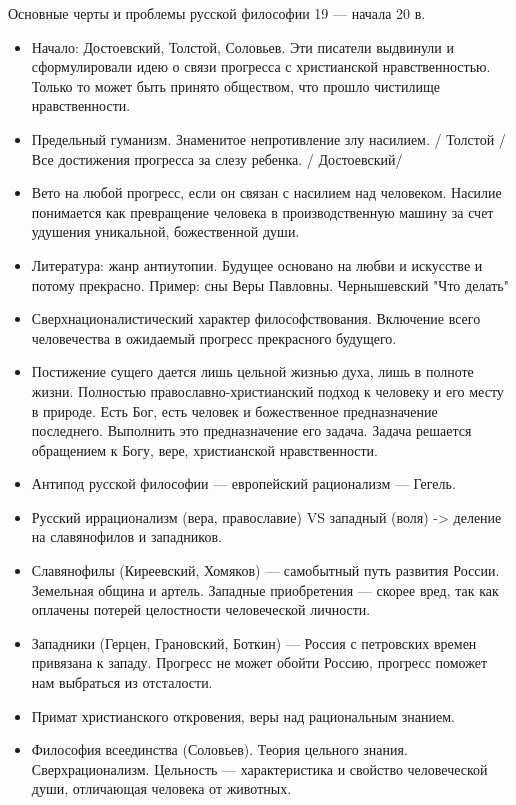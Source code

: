 \documentclass[12pt]{article}
\begin{document}
Основные черты и проблемы русской философии 19 --- начала 20 в.
\begin{itemize}
  \item Начало: Достоевский, Толстой, Соловьев.
Эти писатели выдвинули и сформулировали идею о связи прогресса с христианской нравственностью. Только
то может быть принято обществом, что прошло чистилище нравственности.
\item Предельный гуманизм.
Знаменитое непротивление злу насилием. / Толстой /
Все достижения прогресса за слезу ребенка. / Достоевский/ 
\item Вето на любой прогресс, если он связан с насилием над человеком.
Насилие понимается как превращение человека в производственную машину за счет удушения уникальной,
божественной души.
\item Литература: жанр антиутопии.
Будущее основано на любви и искусстве и потому прекрасно. Пример: сны Веры Павловны. Чернышевский
"Что делать"
\item Сверхнационалистический характер философствования. 
Включение всего человечества в ожидаемый прогресс прекрасного будущего.
\item Постижение сущего дается лишь цельной жизнью духа, лишь в полноте жизни.
Полностью православно-христианский подход к человеку и его месту в природе. Есть Бог, есть человек и
божественное  предназначение  последнего.  Выполнить  это  предназначение  его  задача.  Задача  решается
обращением к Богу, вере, христианской нравственности.
\item Антипод русской философии --- европейский рационализм --- Гегель.
\item Русский иррационализм (вера, православие) VS западный (воля) -> деление на славянофилов и западников.
\item  Славянофилы  (Киреевский,  Хомяков)  ---  самобытный  путь  развития  России.  Земельная  община  и  артель.
Западные приобретения --- скорее вред, так как оплачены потерей целостности человеческой личности.
\item Западники (Герцен, Грановский, Боткин) --- Россия с петровских времен привязана к западу. Прогресс не может
обойти Россию, прогресс поможет нам выбраться из отсталости.
\item Примат христианского откровения, веры над рациональным знанием.
\item Философия всеединства (Соловьев). Теория цельного знания. Сверхрационализм. Цельность --- характеристика
и свойство человеческой души, отличающая человека от животных.
\end{itemize}
\end{document}

